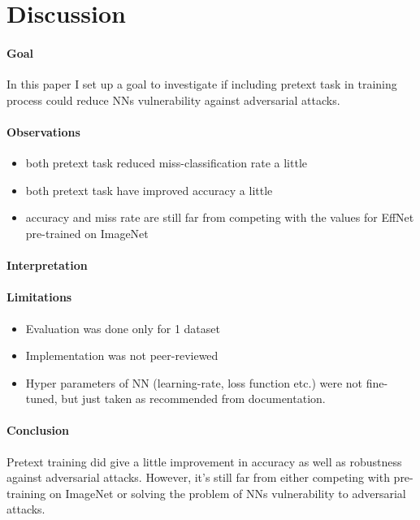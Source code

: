 \section{Discussion}

\paragraph{Goal}
In this paper I set up a goal to investigate if including pretext task in training process could reduce NNs
vulnerability against adversarial attacks.

\paragraph{Observations}
\begin{itemize}
    \item both pretext task reduced miss-classification rate a little
    \item both pretext task have improved accuracy a little
    \item accuracy and miss rate are still far from competing with the values for EffNet pre-trained on ImageNet
\end{itemize}

\paragraph{Interpretation}

\paragraph{Limitations}
\begin{itemize}
    \item Evaluation was done only for 1 dataset
    \item Implementation was not peer-reviewed
    \item Hyper parameters of NN (learning-rate, loss function etc.) were not fine-tuned,
    but just taken as recommended from documentation.
\end{itemize}

\paragraph{Conclusion}
Pretext training did give a little improvement in accuracy as well as robustness against adversarial attacks.
However, it's still far from either competing with pre-training on ImageNet or solving the problem of NNs vulnerability
to adversarial attacks.

